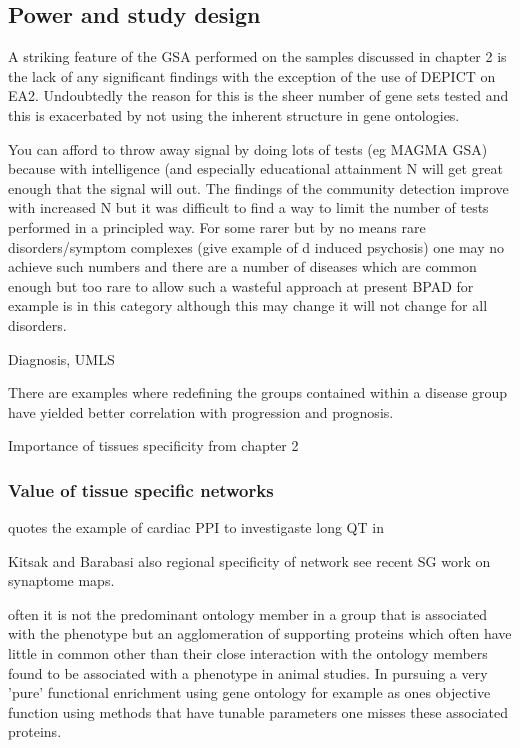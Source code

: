\subsection{Power and study design}
 
 A striking feature of the GSA performed on the samples discussed in chapter 2 is the lack of any significant findings with the exception of the use of DEPICT on EA2. Undoubtedly the reason for this is the sheer number of gene sets tested and this is exacerbated by not using the inherent structure in gene ontologies. 
 
 You can afford to throw away signal by doing lots of tests (eg MAGMA GSA) because with intelligence (and especially educational attainment N will get great enough that the signal will out. The findings of the community detection improve with increased N but it was difficult to find a way to limit the number of tests performed in a principled way. For some rarer but by no means rare disorders/symptom complexes (give example of d induced psychosis) one may no achieve such numbers and there are a number of diseases which are common enough but too rare to allow such a wasteful approach at present BPAD for example is in this category although this may change it will not change for all disorders.
 
 
 
Diagnosis, UMLS

 There are examples where redefining the groups contained within a disease group have yielded better correlation with progression and prognosis. 

Importance of tissues specificity from chapter 2 \subsubsection{Value of tissue specific networks}
\label{sec:value_of_tissue_specific_networks}

\cite{parikshak2015systems} quotes the example of cardiac PPI to investigaste long QT in \cite{lundby2014annotation}

Kitsak and Barabasi \cite{kitsak2016tissue}
also regional specificity of network see recent SG work on synaptome maps. 



 often it is not the predominant ontology member in a group that is associated with the phenotype but an agglomeration of supporting proteins which often have little in common other than their close interaction with the ontology members found to be associated with a phenotype in animal studies. In pursuing a very 'pure' functional enrichment using gene ontology for example as ones objective function using methods that have tunable parameters one misses these associated proteins. 

